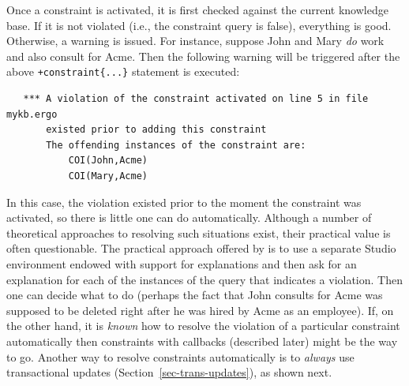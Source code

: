 Once a constraint is activated, it is first checked against the current
knowledge base. If it is not violated (i.e., the constraint
query is false), everything is good. Otherwise, a
warning is issued. For instance, suppose John and Mary \emph{do}
work and also consult for
Acme. Then the following warning will be triggered after the above
\texttt{+constraint\{...\}} statement is executed: 
\begin{verbatim}
   *** A violation of the constraint activated on line 5 in file mykb.ergo 
       existed prior to adding this constraint
       The offending instances of the constraint are:
           COI(John,Acme)
           COI(Mary,Acme)
\end{verbatim}
In this case, the violation existed prior to the moment the constraint was
activated, so there is little one can do automatically. Although a number of
theoretical
approaches to resolving such situations exist, their practical value is
often questionable.  The practical approach offered by \ERGO is to use a separate
Studio environment endowed with support for explanations and then 
ask for an explanation for each of the instances of the query that
indicates a violation. Then one can decide what to do (perhaps the
fact that John consults for Acme was supposed to be
deleted right after he was hired by Acme as an employee).
If, on the other hand, it is \emph{known} how to resolve the violation of
a particular constraint automatically then constraints with callbacks
(described later) might be the way to go.
Another way to resolve constraints automatically is to \emph{always} use
transactional updates (Section~\ref{sec-trans-updates}), as shown next. 

